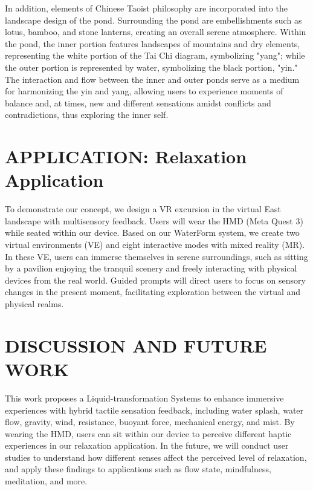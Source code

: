 \documentclass[manuscript]{acmart} %
\begin{document}
In addition, elements of Chinese Taoist philosophy are incorporated into the landscape design of the pond. Surrounding the pond are embellishments such as lotus, bamboo, and stone lanterns, creating an overall serene atmosphere. Within the pond, the inner portion features landscapes of mountains and dry elements, representing the white portion of the Tai Chi diagram, symbolizing "yang"; while the outer portion is represented by water, symbolizing the black portion, "yin." The interaction and flow between the inner and outer ponds serve as a medium for harmonizing the yin and yang, allowing users to experience moments of balance and, at times, new and different sensations amidst conflicts and contradictions, thus exploring the inner self.

\section{APPLICATION: Relaxation Application}
To demonstrate our concept, we design a VR excursion in the virtual East landscape with multisensory feedback. Users will wear the HMD (Meta Quest 3) while seated within our device. Based on our WaterForm system, we create two virtual environments (VE) and eight interactive modes with mixed reality (MR). In these VE, users can immerse themselves in serene surroundings, such as sitting by a pavilion enjoying the tranquil scenery and freely interacting with physical devices from the real world. Guided prompts will direct users to focus on sensory changes in the present moment, facilitating exploration between the virtual and physical realms.

\section{DISCUSSION AND FUTURE WORK}
This work proposes a Liquid-transformation Systems to enhance immersive experiences with hybrid tactile sensation feedback, including water splash, water flow, gravity, wind, resistance, buoyant force, mechanical energy, and mist. By wearing the HMD, users can sit within our device to perceive different haptic experiences in our relaxation application. In the future, we will conduct user studies to understand how different senses affect the perceived level of relaxation, and apply these findings to applications such as flow state, mindfulness, meditation, and more.




\appendix
\end{document}
